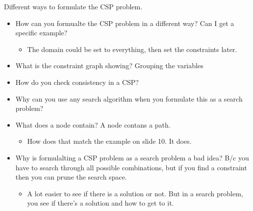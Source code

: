 \begin{example}
    Different ways to formulate the CSP problem. 
    \begin{itemize}
        \item How can you formualte the CSP problem in a different way? Can I get a specific example?
        \begin{itemize}
            \item The domain could be set to everything, then set the constraints later.
        \end{itemize}
        \item What is the constraint graph showing? Grouping the variables
        \item How do you check consistency in a CSP?
        \item Why can you use any search algorithm when you formulate this as a search problem? 
        \item What does a node contain? A node contans a path. 
        \begin{itemize}
            \item How does that match the example on slide 10. It does. 
        \end{itemize}
        \item Why is formulalting a CSP problem as a search problem a bad idea? B/c you have to search through all possible combinations, but if you find a constraint then you can prune the search space.
        \begin{itemize}
            \item A lot easier to see if there is a solution or not. But in a search problem, you see if there's a solution and how to get to it. 
        \end{itemize}
    \end{itemize}
\end{example}
\newpage





